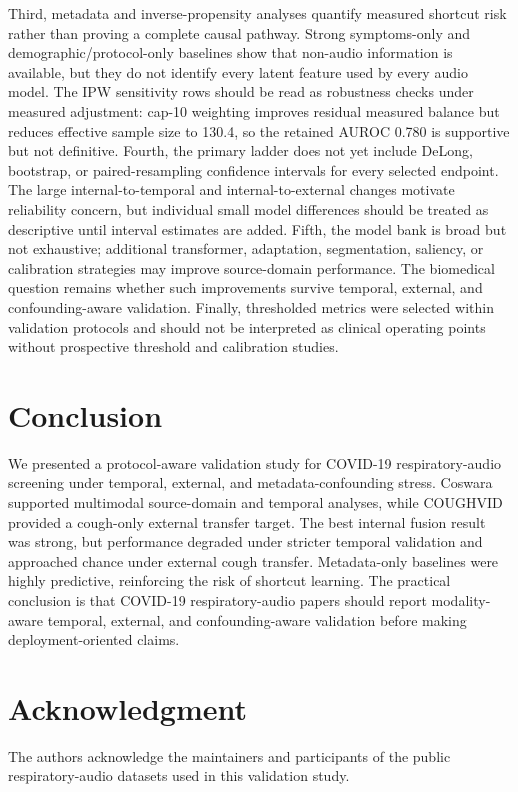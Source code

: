 \documentclass[journal]{IEEEtran}
\begin{document}
Third, metadata and inverse-propensity analyses quantify measured shortcut risk rather than proving a complete causal pathway. Strong symptoms-only and demographic/protocol-only baselines show that non-audio information is available, but they do not identify every latent feature used by every audio model. The IPW sensitivity rows should be read as robustness checks under measured adjustment: cap-10 weighting improves residual measured balance but reduces effective sample size to 130.4, so the retained AUROC 0.780 is supportive but not definitive. Fourth, the primary ladder does not yet include DeLong, bootstrap, or paired-resampling confidence intervals for every selected endpoint. The large internal-to-temporal and internal-to-external changes motivate reliability concern, but individual small model differences should be treated as descriptive until interval estimates are added. Fifth, the model bank is broad but not exhaustive; additional transformer, adaptation, segmentation, saliency, or calibration strategies may improve source-domain performance. The biomedical question remains whether such improvements survive temporal, external, and confounding-aware validation. Finally, thresholded metrics were selected within validation protocols and should not be interpreted as clinical operating points without prospective threshold and calibration studies.

\section{Conclusion}
We presented a protocol-aware validation study for COVID-19 respiratory-audio screening under temporal, external, and metadata-confounding stress. Coswara supported multimodal source-domain and temporal analyses, while COUGHVID provided a cough-only external transfer target. The best internal fusion result was strong, but performance degraded under stricter temporal validation and approached chance under external cough transfer. Metadata-only baselines were highly predictive, reinforcing the risk of shortcut learning. The practical conclusion is that COVID-19 respiratory-audio papers should report modality-aware temporal, external, and confounding-aware validation before making deployment-oriented claims.

\section*{Acknowledgment}
The authors acknowledge the maintainers and participants of the public respiratory-audio datasets used in this validation study.



\end{document}
